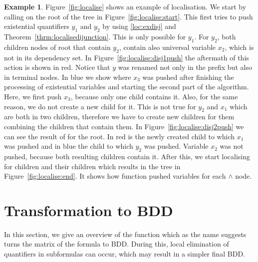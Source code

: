 \documentclass[
  digital, %
  color,
  twoside, %
  table,   %
  nolof,     %
  nolot,     %
]{fithesis3}
\theoremstyle{definition}
\newtheorem{example}{Example}
\theoremstyle{remark}
\begin{document}
\begin{example}
  \label{ex:QTlocalising}
  Figure~\ref{fig:localise} shows an example of localisation. We start by calling  on the root of the tree in Figure~\ref{fig:localise:start}. This first tries to push existential quantifiers $y_1$ and $y_2$ by using \eqref{loc:exdisj} and Theorem~\ref{thrm:localisedijunction}. This is only possible for $y_1$. For $y_2$, both children nodes of root that contain $y_2$, contain also universal variable $x_2$, which is not in its dependency set. In Figure~\ref{fig:localise:disj1push} the aftermath of this action is shown in red. Notice that $y$ was renamed not only in the prefix but also in terminal nodes. In blue we show where $x_3$ was pushed after finishing the processing of existential variables and starting the second part of the algorithm. Here, we first push $x_3$, because only one child contains it. Also, for the same reason, we do not create a new child for it. This is not true for $y_2$ and $x_1$ which are both in two children, therefore we have to create new children for them combining the children that contain them. In Figure~\ref{fig:localise:disj2push} we can see the result of  for the root. In red is the newly created child to which $x_1$ was pushed and in blue the child to which $y_2$ was pushed. Variable $x_2$ was not pushed, because both resulting children contain it. After this, we start localising for children and their children which results in the tree in Figure~\ref{fig:localise:end}. It shows how function  pushed variables for each ${\land}$ node.
\end{example}

\section{Transformation to BDD}
\label{sec:algturntobdd}
In this section, we give an overview of the function  which as the name suggests turns the matrix of the formula to BDD. During this, local elimination of quantifiers in subformulas can occur, which may result in a simpler final BDD. 
\end{document}
